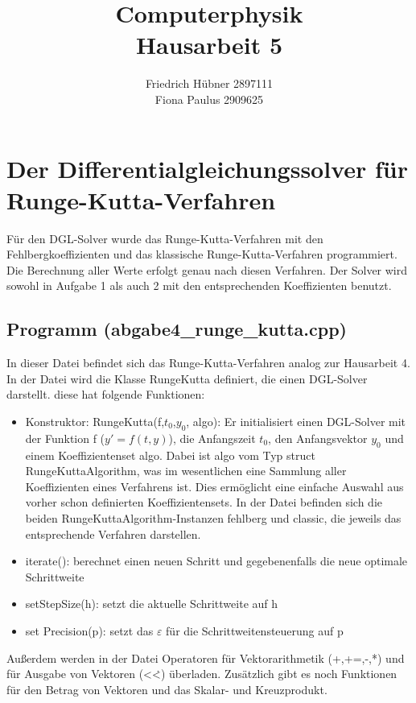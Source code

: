 \documentclass{scrreprt}
\author{Friedrich Hübner 2897111\\
Fiona Paulus 2909625}
\title{Computerphysik\\Hausarbeit 5}
\begin{document}
\maketitle
\newpage

\chapter*{Der Differentialgleichungssolver für Runge-Kutta-Verfahren}
Für den DGL-Solver wurde das Runge-Kutta-Verfahren mit den Fehlbergkoeffizienten und das klassische Runge-Kutta-Verfahren programmiert. Die Berechnung aller Werte erfolgt genau nach diesen Verfahren. Der Solver wird sowohl in Aufgabe 1 als auch 2 mit den entsprechenden Koeffizienten benutzt. 

\section*{Programm (abgabe4\_runge\_kutta.cpp)}
In dieser Datei befindet sich das Runge-Kutta-Verfahren analog zur Hausarbeit 4.\\

In der Datei wird die Klasse RungeKutta definiert, die einen DGL-Solver darstellt. diese hat folgende Funktionen:
\begin{itemize}
	\item Konstruktor: RungeKutta(f,$t_0$,$y_0$, algo): Er initialisiert einen DGL-Solver mit der Funktion f ($y' = f(t,y)$), die Anfangszeit $t_0$, den Anfangsvektor $y_0$ und einem Koeffizientenset algo. Dabei ist algo vom Typ struct RungeKuttaAlgorithm, was im wesentlichen eine Sammlung aller Koeffizienten eines Verfahrens ist. Dies ermöglicht eine einfache Auswahl aus vorher schon definierten Koeffizientensets. In der Datei befinden sich die beiden RungeKuttaAlgorithm-Instanzen fehlberg und classic, die jeweils das entsprechende Verfahren darstellen. 
	\item iterate(): berechnet einen neuen Schritt und gegebenenfalls die neue optimale Schrittweite
	\item setStepSize(h): setzt die aktuelle Schrittweite auf h
	\item set Precision(p): setzt das $\varepsilon$ für die Schrittweitensteuerung auf p
\end{itemize}

Außerdem werden in der Datei Operatoren für Vektorarithmetik (+,+=,-,*) und für Ausgabe von Vektoren (<\.<) überladen. Zusätzlich gibt es noch Funktionen für den Betrag von Vektoren und das Skalar- und Kreuzprodukt.  
\end{document}
